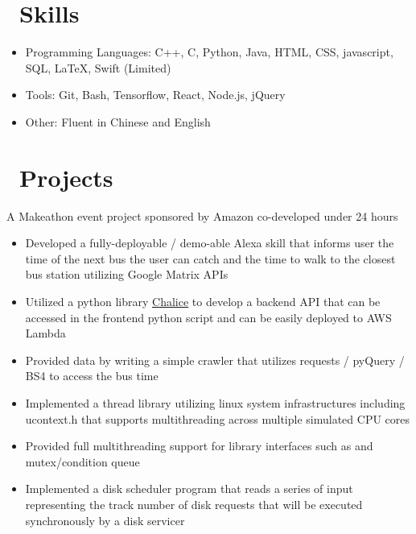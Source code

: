 \documentclass{resume}
\begin{document}

\section{\faCogs\ Skills}
\begin{itemize}[parsep=0.5ex]
  \item Programming Languages: C++, C, Python, Java, HTML, CSS,  javascript, SQL, \LaTeX, Swift (Limited)
  \item Tools: Git, Bash, Tensorflow, React, Node.js, jQuery
  \item Other: Fluent in Chinese and English
\end{itemize}

\section{\faWrench\ Projects}
A Makeathon event project sponsored by Amazon co-developed under 24 hours
\begin{itemize}
	\item Developed a fully-deployable / demo-able Alexa skill that informs user the time of the next bus the user can catch and the time to walk to the closest bus station utilizing Google Matrix APIs
	\item Utilized a python library \href{https://github.com/aws/chalice}{\underline{Chalice}} to develop a backend API that can be accessed in the frontend python script and can be easily deployed to AWS Lambda
	\item Provided data by writing a simple crawler that utilizes requests / pyQuery / BS4 to access the bus time
\end{itemize}

\begin{itemize}
	\item Implemented a thread library utilizing linux system infrastructures including ucontext.h that supports multithreading across multiple simulated CPU cores
	\item Provided full multithreading support for library interfaces such as and mutex/condition queue
	\item Implemented a disk scheduler program that reads a series of input representing the track number of disk requests that will be executed synchronously by a disk servicer
\end{itemize}
\end{document}
